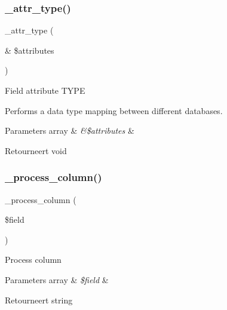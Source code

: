 \subsubsection{\texorpdfstring{\_attr\_type()}{\_attr\_type()}}
{\footnotesize\ttfamily \+\_\+attr\+\_\+type (\begin{DoxyParamCaption}\item[{\&}]{\$attributes }\end{DoxyParamCaption})\hspace{0.3cm}{\ttfamily [protected]}}

Field attribute T\+Y\+PE

Performs a data type mapping between different databases.


\begin{DoxyParams}[1]{Parameters}
array & {\em \&\$attributes} & \\
\hline
\end{DoxyParams}
\begin{DoxyReturn}{Retourneert}
void 
\end{DoxyReturn}
\mbox{\label{class_c_i___d_b__sqlite__forge_a8f38f1c5b5dddecca4befbe393f3f299}} 
\subsubsection{\texorpdfstring{\_process\_column()}{\_process\_column()}}
{\footnotesize\ttfamily \+\_\+process\+\_\+column (\begin{DoxyParamCaption}\item[{}]{\$field }\end{DoxyParamCaption})\hspace{0.3cm}{\ttfamily [protected]}}

Process column


\begin{DoxyParams}[1]{Parameters}
array & {\em \$field} & \\
\hline
\end{DoxyParams}
\begin{DoxyReturn}{Retourneert}
string 
\end{DoxyReturn}
\mbox{\label{class_c_i___d_b__sqlite__forge_a902a7267babceb2ce595706f217e00ad}} 
